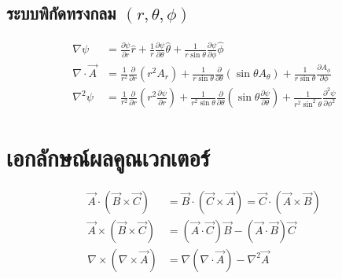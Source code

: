 \subsection{\texorpdfstring{ระบบพิกัดทรงกลม $(r, \theta, \phi)$}{ระบบพิกัดทรงกลม (r, theta, phi)}}
\begin{align}
\nabla \psi &= \frac{\partial \psi}{\partial r}\hat{r} + \frac{1}{r}\frac{\partial \psi}{\partial \theta}\hat{\theta} + \frac{1}{r\sin\theta}\frac{\partial \psi}{\partial \phi}\hat{\phi} \\
\nabla \cdot \vec{A} &= \frac{1}{r^2}\frac{\partial}{\partial r}(r^2 A_r) + \frac{1}{r\sin\theta}\frac{\partial}{\partial \theta}(\sin\theta A_\theta) + \frac{1}{r\sin\theta}\frac{\partial A_\phi}{\partial \phi} \\
\nabla^2 \psi &= \frac{1}{r^2}\frac{\partial}{\partial r}\left(r^2\frac{\partial \psi}{\partial r}\right) + \frac{1}{r^2\sin\theta}\frac{\partial}{\partial \theta}\left(\sin\theta\frac{\partial \psi}{\partial \theta}\right) + \frac{1}{r^2\sin^2\theta}\frac{\partial^2 \psi}{\partial \phi^2}
\end{align}

\section{เอกลักษณ์ผลคูณเวกเตอร์}
\begin{align}
\vec{A} \cdot (\vec{B} \times \vec{C}) &= \vec{B} \cdot (\vec{C} \times \vec{A}) = \vec{C} \cdot (\vec{A} \times \vec{B}) \\
\vec{A} \times (\vec{B} \times \vec{C}) &= (\vec{A} \cdot \vec{C})\vec{B} - (\vec{A} \cdot \vec{B})\vec{C} \\
\nabla \times (\nabla \times \vec{A}) &= \nabla(\nabla \cdot \vec{A}) - \nabla^2 \vec{A}
\end{align}

